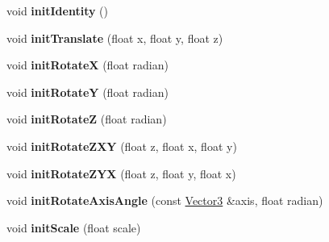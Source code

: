 \begin{DoxyCompactItemize}
\item 
void {\bfseries init\+Identity} ()\hypertarget{class_i_dream_sky_1_1_matrix4_a507568577193f5f6ffc02cfffce34f5a}{}\label{class_i_dream_sky_1_1_matrix4_a507568577193f5f6ffc02cfffce34f5a}

\item 
void {\bfseries init\+Translate} (float x, float y, float z)\hypertarget{class_i_dream_sky_1_1_matrix4_a3cbafa8546b9bb40b4e3fefad2060c8a}{}\label{class_i_dream_sky_1_1_matrix4_a3cbafa8546b9bb40b4e3fefad2060c8a}

\item 
void {\bfseries init\+RotateX} (float radian)\hypertarget{class_i_dream_sky_1_1_matrix4_a1602b73786b183d98d22beead9e79e7e}{}\label{class_i_dream_sky_1_1_matrix4_a1602b73786b183d98d22beead9e79e7e}

\item 
void {\bfseries init\+RotateY} (float radian)\hypertarget{class_i_dream_sky_1_1_matrix4_afd3bc6faacc5f0fc2cfa1e04e28d1d32}{}\label{class_i_dream_sky_1_1_matrix4_afd3bc6faacc5f0fc2cfa1e04e28d1d32}

\item 
void {\bfseries init\+RotateZ} (float radian)\hypertarget{class_i_dream_sky_1_1_matrix4_a1e963dca05feed815ecf66d8c8346a58}{}\label{class_i_dream_sky_1_1_matrix4_a1e963dca05feed815ecf66d8c8346a58}

\item 
void {\bfseries init\+Rotate\+Z\+XY} (float z, float x, float y)\hypertarget{class_i_dream_sky_1_1_matrix4_a1bd6a04e7e99aad7557a35d6383a7405}{}\label{class_i_dream_sky_1_1_matrix4_a1bd6a04e7e99aad7557a35d6383a7405}

\item 
void {\bfseries init\+Rotate\+Z\+YX} (float z, float y, float x)\hypertarget{class_i_dream_sky_1_1_matrix4_add4020087add92cb19c2d09dffd4d923}{}\label{class_i_dream_sky_1_1_matrix4_add4020087add92cb19c2d09dffd4d923}

\item 
void {\bfseries init\+Rotate\+Axis\+Angle} (const \hyperlink{class_i_dream_sky_1_1_vector3}{Vector3} \&axis, float radian)\hypertarget{class_i_dream_sky_1_1_matrix4_a25d3cfdfd2bfa0162c4508c72b95f5d2}{}\label{class_i_dream_sky_1_1_matrix4_a25d3cfdfd2bfa0162c4508c72b95f5d2}

\item 
void {\bfseries init\+Scale} (float scale)\hypertarget{class_i_dream_sky_1_1_matrix4_a9234a8bdc30fc6f45986cb8e06d2c755}{}\label{class_i_dream_sky_1_1_matrix4_a9234a8bdc30fc6f45986cb8e06d2c755}


\end{DoxyCompactItemize}
